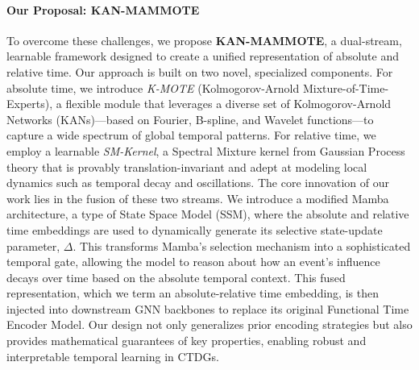 \documentclass{article}
\begin{document}
\paragraph{Our Proposal: KAN-MAMMOTE}
To overcome these challenges, we propose \textbf{KAN-MAMMOTE}, a dual-stream, learnable framework designed to create a unified representation of absolute and relative time. Our approach is built on two novel, specialized components. For absolute time, we introduce \textit{K-MOTE} (Kolmogorov-Arnold Mixture-of-Time-Experts), a flexible module that leverages a diverse set of Kolmogorov-Arnold Networks (KANs)—based on Fourier, B-spline, and Wavelet functions—to capture a wide spectrum of global temporal patterns. For relative time, we employ a learnable \textit{SM-Kernel}, a Spectral Mixture kernel from Gaussian Process theory that is provably translation-invariant and adept at modeling local dynamics such as temporal decay and oscillations. The core innovation of our work lies in the fusion of these two streams. We introduce a modified Mamba architecture, a type of State Space Model (SSM), where the absolute and relative time embeddings are used to dynamically generate its selective state-update parameter, $\Delta$. This transforms Mamba's selection mechanism into a sophisticated temporal gate, allowing the model to reason about how an event's influence decays over time based on the absolute temporal context. This fused representation, which we term an absolute-relative time embedding, is then injected into downstream GNN backbones to replace its original Functional Time Encoder Model. Our design not only generalizes prior encoding strategies but also provides mathematical guarantees of key properties, enabling robust and interpretable temporal learning in CTDGs.
\end{document}

